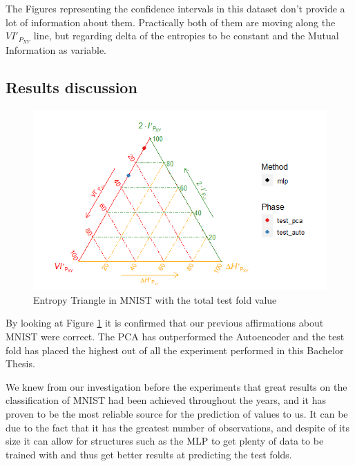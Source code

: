The Figures representing the confidence intervals in this dataset don't provide a lot of information about them. Practically both of them are moving along the $VI'_{P_{XY}}$ line, but regarding delta of the entropies to be constant and the Mutual Information as variable.\par

\subsection{Results discussion} 

\begin{figure}[H]
	\centering
	\includegraphics[width=1\linewidth]{Figuras_tfg/MNIST_performance_test}
	\caption{Entropy Triangle in MNIST with the total test fold value}
	\label{fig:figure_Total_MNIST_ET}
\end{figure}

By looking at Figure \ref{fig:figure_Total_MNIST_ET} it is confirmed that our previous affirmations about MNIST were correct. The PCA has outperformed the Autoencoder and the test fold has placed the highest out of all the experiment performed in this Bachelor Thesis. \par

We knew from our investigation before the experiments that great results on the classification of MNIST had been achieved throughout the years, and it has proven to be the most reliable source for the prediction of values to us. It can be due to the fact that it has the greatest number of observations, and despite of its size it can allow for structures such as the MLP to get plenty of data to be trained with and thus get better results at predicting the test folds. \par



